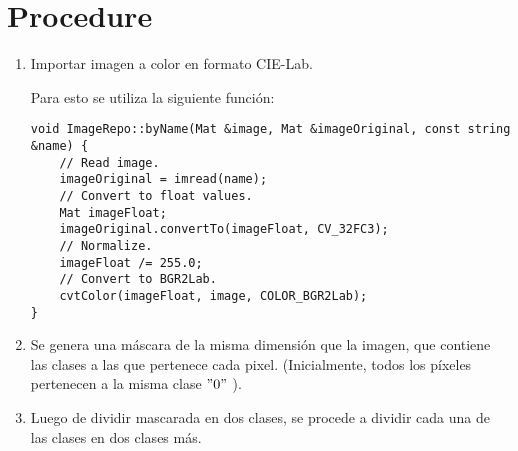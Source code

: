 \section{Procedure}\label{sec:procedure}
\begin{enumerate}
    \item Importar imagen a color en formato CIE-Lab.

    Para esto se utiliza la siguiente función:
    \begin{lstlisting}
void ImageRepo::byName(Mat &image, Mat &imageOriginal, const string &name) {
    // Read image.
    imageOriginal = imread(name);
    // Convert to float values.
    Mat imageFloat;
    imageOriginal.convertTo(imageFloat, CV_32FC3);
    // Normalize.
    imageFloat /= 255.0;
    // Convert to BGR2Lab.
    cvtColor(imageFloat, image, COLOR_BGR2Lab);
}
    \end{lstlisting}

    \item Se genera una máscara de la misma dimensión que la imagen, que contiene las clases a las que pertenece cada pixel.
    (Inicialmente, todos los píxeles pertenecen a la misma clase \("0"\) ).
    \item Luego de dividir mascarada en dos clases, se procede a dividir cada una de las clases en dos clases más.
\end{enumerate}
